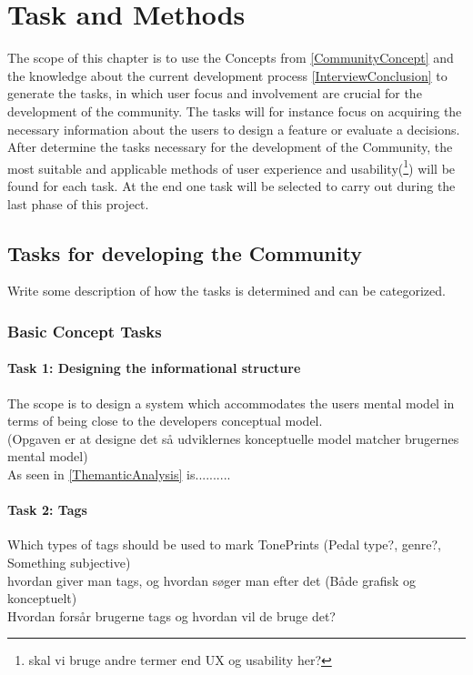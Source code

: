 \chapter{Task and Methods}
\label{TaskAndMethods}
The scope of this chapter is to use the Concepts from \autoref{CommunityConcept} and the knowledge about the current development process \autoref{InterviewConclusion} to generate the tasks, in which user focus and involvement are crucial for the development of the community. The tasks will for instance focus on acquiring the necessary information about the users to design a feature or evaluate a decisions. After determine the tasks necessary for the development of the Community, the most suitable and applicable methods of user experience and usability(\footnote{skal vi bruge andre termer end UX og usability her?}) will be found for each task. At the end one task will be selected to carry out during the last phase of this project. 

\section{Tasks for developing the Community}
\label{TasksForDevelopingTheCommunity}
Write some description of how the tasks is determined and can be categorized. 

\subsection{Basic Concept Tasks}
\label{BasicConceptTaks}

\subsubsection{Task 1: Designing the informational structure}
\label{Task1}
The scope is to design a system which accommodates the users mental model in terms of being close to the developers conceptual model.\\
(Opgaven er at designe det så udviklernes konceptuelle model matcher brugernes mental model)\\
As seen in \autoref{ThemanticAnalysis} is..........

\subsubsection{Task 2: Tags}
\label{Task2}
Which types of tags should be used to mark TonePrints (Pedal type?, genre?, Something subjective)\\
hvordan giver man tags, og hvordan søger man efter det (Både grafisk og konceptuelt)\\
Hvordan forsår brugerne tags og hvordan vil de bruge det?

